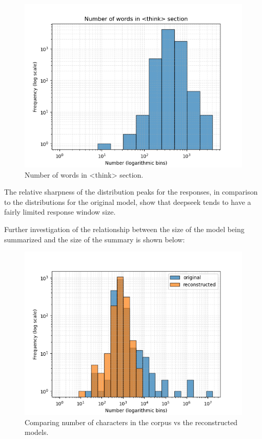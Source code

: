 \documentclass[conference]{IEEEtran}
\begin{document}
            \begin{figure}[htbp]
                \centerline{\includegraphics[width=\linewidth]{"./Number of words in <think> section.png"}}
                \caption{Number of words in <think> section.}
                \label{fig}
                \end{figure}

The relative sharpness of the distribution peaks for the responses, in comparison to the distributions for the original model, show that deepseek tends to have a fairly limited response window size.

Further investigation of the relationship between the size of the model being summarized and the size of the summary is shown below:

\begin{figure}[htbp]
    \centerline{\includegraphics[width=\linewidth]{"./Comparing number of characters in the corpus vs the reconstructed models.png"}}
    \caption{Comparing number of characters in the corpus vs the reconstructed models.}
    \label{fig}
    \end{figure}
    
\end{document}
